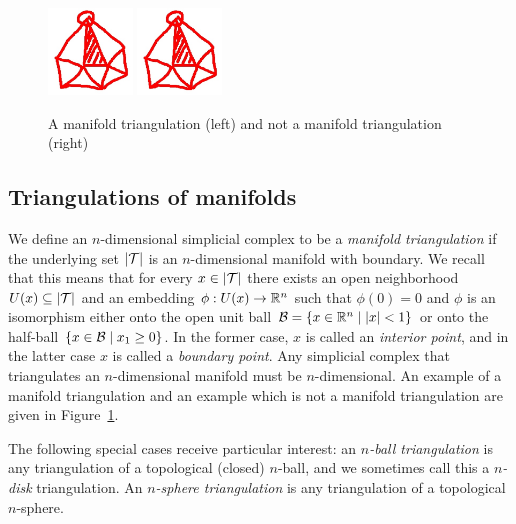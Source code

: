 \documentclass[10pt,a4paper]{article}
\newcommand{\mwl}[1]{{\color{red}#1}}
\begin{document}
\begin{figure}[h]
\centerline{\includegraphics[width=0.2\textwidth]{revision/homotopic_ball.jpg} \quad \includegraphics[width=0.2\textwidth]{revision/homotopic_ball.jpg}}
\caption{A manifold triangulation (left) and not a manifold triangulation (right)}
\label{figure:not_manifold_triang}
\end{figure}


\subsection{Triangulations of manifolds}

We define an $n$-dimensional simplicial complex to be a \emph{manifold triangulation} if the underlying set $\left| {\mathcal T} \right|$ is an $n$-dimensional manifold with boundary.
We recall that this means that for every $x \in \left| {\mathcal T} \right|$
there exists an open neighborhood $U(x) \subseteq \left| {\mathcal T} \right|$ and an embedding $\phi : U(x) \rightarrow {\mathbb R}^{n}$
such that $\phi(0) = 0$ and $\phi$ is an isomorphism either onto the open unit ball $\calB = \{ x \in \bbR^{n} \suchthat |x| < 1 \}$
or onto the half-ball $\{ x \in \calB \suchthat x_1 \geq 0 \}$.
In the former case, $x$ is called an \emph{interior point}, and in the latter case $x$ is called a \emph{boundary point}. 
Any simplicial complex that triangulates an $n$-dimensional manifold must be $n$-dimensional. 
An example of a manifold triangulation and an example which is not a manifold triangulation are given in Figure~\ref{figure:not_manifold_triang}.

The following special cases receive particular interest:
an \textit{$n$-ball triangulation} is any triangulation of a topological (closed) $n$-ball\mwl{, and we sometimes call this a \textit{$n$-disk} triangulation}.
An \textit{$n$-sphere triangulation} is any triangulation of a topological $n$-sphere. 
\end{document}
